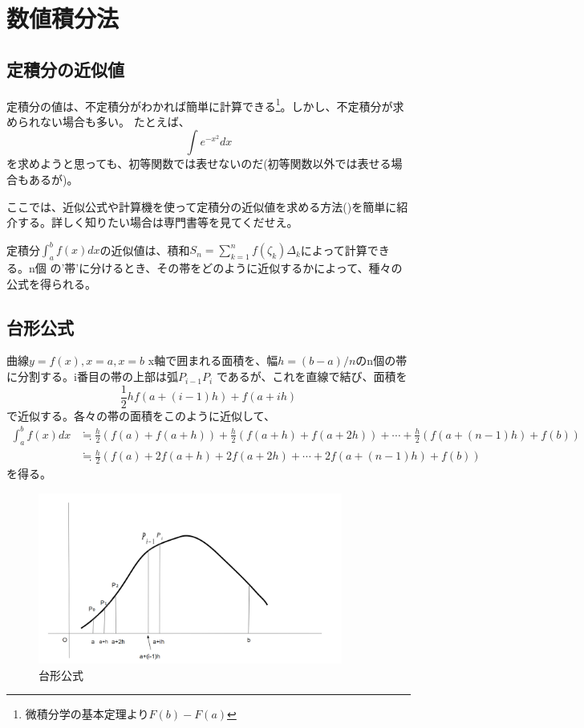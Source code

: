 \documentclass[a4j,dvipdfmx]{jsarticle}
\begin{document}
\section*{数値積分法}
\subsection*{定積分の近似値}
定積分の値は、不定積分がわかれば簡単に計算できる\footnote{微積分学の基本定理より$F(b)-F(a)$}。しかし、不定積分が求められない場合も多い。
たとえば、
\begin{equation*}
    \int e^{-x^2}dx
\end{equation*}
を求めようと思っても、初等関数では表せないのだ(初等関数以外では表せる場合もあるが)。

ここでは、近似公式や計算機を使って定積分の近似値を求める方法()を簡単に紹介する。詳しく知りたい場合は専門書等を見てくだせえ。

定積分$\int_a^b f(x)dx$の近似値は、積和$S_n=\sum_{k=1}^n f(\zeta_k)\Delta_k$によって計算できる。n個
の'帯'に分けるとき、その帯をどのように近似するかによって、種々の公式を得られる。
\subsection{台形公式}
曲線$y=f(x),x=a,x=b$ x軸で囲まれる面積を、幅$h=(b-a)/n$のn個の帯に分割する。i番目の帯の上部は弧$P_{i-1}P_i$
であるが、これを直線で結び、面積を
\begin{equation}
 \frac{1}{2}h{f(a+(i-1)h)+f(a+ih)}   
\end{equation}
で近似する。各々の帯の面積をこのように近似して、
\begin{align}
    \int_a^b f(x)dx&\fallingdotseq \frac{h}{2}(f(a)+f(a+h))+\frac{h}{2}(f(a+h)+f(a+2h))+\cdots+\frac{h}{2}(f(a+(n-1)h)+f(b))\\
    \label{trapezeopdal rule}
    &\fallingdotseq\frac{h}{2}(f(a)+2f(a+h)+2f(a+2h)+\cdots+2f(a+(n-1)h)+f(b))
\end{align}
を得る。
\begin{figure}[h]
    \centering
    \includegraphics[width=10cm,scale=5]{img/trapezoidal_rule.png}
    \caption{台形公式}
\end{figure}
\newpage
\end{document}
